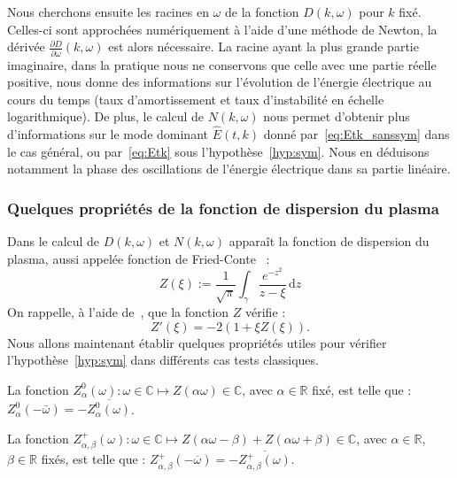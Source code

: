 Nous cherchons ensuite les racines en $\omega$ de la fonction $D(k,\omega)$ pour $k$ fixé. Celles-ci sont approchées numériquement à l'aide d'une méthode de Newton, la dérivée $\frac{\partial D}{\partial\omega}(k,\omega)$ est alors nécessaire. La racine ayant la plus grande partie imaginaire, dans la pratique nous ne conservons que celle avec une partie réelle positive, nous donne des informations sur l'évolution de l'énergie électrique au cours du temps (taux d'amortissement et taux d'instabilité en échelle logarithmique). De plus, le calcul de $N(k,\omega)$ nous permet d'obtenir plus d'informations sur le mode dominant $\hat{E}(t,k)$ donné par~\eqref{eq:Etk_sanssym} dans le cas général, ou par~\eqref{eq:Etk} sous l'hypothèse~\ref{hyp:sym}. Nous en déduisons notamment la phase des oscillations de l'énergie électrique dans sa partie linéaire.


\subsubsection{Quelques propriétés de la fonction de dispersion du plasma}

Dans le calcul de $D(k,\omega)$ et $N(k,\omega)$ apparaît la fonction de dispersion du plasma, aussi appelée fonction de Fried-Conte~\cite{Fried:1961} :
\begin{equation}
  Z(\xi):=\frac{1}{\sqrt{\pi}} \int_\gamma \frac{e^{-z^2}}{z-\xi}\,\mathrm{d}z
  \label{eq:Zfct}
\end{equation}
On rappelle, à l'aide de~\cite{Fried:1961}, que la fonction $Z$ vérifie :
\begin{equation}
  Z'(\xi)=-2\left(1+\xi Z(\xi)\right).
  \label{eq:Zder}
\end{equation}
Nous allons maintenant établir quelques propriétés utiles pour vérifier l'hypothèse~\ref{hyp:sym} dans différents cas tests classiques.

\begin{lemma}
  La fonction $Z_\alpha^0(\omega):\omega\in\mathbb{C}\mapsto Z\left(\alpha\omega\right)\in\mathbb{C}$, avec $\alpha\in\mathbb{R}$ fixé, est telle que : $Z_\alpha^0(-\bar{\omega}) = -\overline{Z_\alpha^0(\omega)}$.
  \label{lemma:Z0}
\end{lemma}

\begin{lemma}
  La fonction $Z_{\alpha,\beta}^+(\omega):\omega\in\mathbb{C}\mapsto Z\left(\alpha\omega-\beta\right)+Z\left(\alpha\omega+\beta\right)\in\mathbb{C}$, avec $\alpha\in\mathbb{R}$, $\beta\in\mathbb{R}$ fixés, est telle que : $Z_{\alpha,\beta}^+\left(-\overline{\omega}\right)=-\overline{Z_{\alpha,\beta}^+(\omega)}$.
  \label{lemma:Z+}
\end{lemma}

